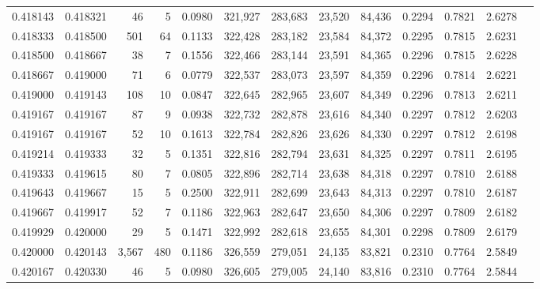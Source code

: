 \begin{tabular}{rrrrrrrrrrrrr}
0.418143 & 0.418321 &    46 &   5 &                                     0.0980 & 321,927 & 283,683 &  23,520 &  84,436 & 0.2294 & 0.7821 & 2.6278 \\
0.418333 & 0.418500 &   501 &  64 &                                     0.1133 & 322,428 & 283,182 &  23,584 &  84,372 & 0.2295 & 0.7815 & 2.6231 \\
0.418500 & 0.418667 &    38 &   7 &                                     0.1556 & 322,466 & 283,144 &  23,591 &  84,365 & 0.2296 & 0.7815 & 2.6228 \\
0.418667 & 0.419000 &    71 &   6 &                                     0.0779 & 322,537 & 283,073 &  23,597 &  84,359 & 0.2296 & 0.7814 & 2.6221 \\
0.419000 & 0.419143 &   108 &  10 &                                     0.0847 & 322,645 & 282,965 &  23,607 &  84,349 & 0.2296 & 0.7813 & 2.6211 \\
0.419167 & 0.419167 &    87 &   9 &                                     0.0938 & 322,732 & 282,878 &  23,616 &  84,340 & 0.2297 & 0.7812 & 2.6203 \\
0.419167 & 0.419167 &    52 &  10 &                                     0.1613 & 322,784 & 282,826 &  23,626 &  84,330 & 0.2297 & 0.7812 & 2.6198 \\
0.419214 & 0.419333 &    32 &   5 &                                     0.1351 & 322,816 & 282,794 &  23,631 &  84,325 & 0.2297 & 0.7811 & 2.6195 \\
0.419333 & 0.419615 &    80 &   7 &                                     0.0805 & 322,896 & 282,714 &  23,638 &  84,318 & 0.2297 & 0.7810 & 2.6188 \\
0.419643 & 0.419667 &    15 &   5 &                                     0.2500 & 322,911 & 282,699 &  23,643 &  84,313 & 0.2297 & 0.7810 & 2.6187 \\
0.419667 & 0.419917 &    52 &   7 &                                     0.1186 & 322,963 & 282,647 &  23,650 &  84,306 & 0.2297 & 0.7809 & 2.6182 \\
0.419929 & 0.420000 &    29 &   5 &                                     0.1471 & 322,992 & 282,618 &  23,655 &  84,301 & 0.2298 & 0.7809 & 2.6179 \\
0.420000 & 0.420143 & 3,567 & 480 &                                     0.1186 & 326,559 & 279,051 &  24,135 &  83,821 & 0.2310 & 0.7764 & 2.5849 \\
0.420167 & 0.420330 &    46 &   5 &                                     0.0980 & 326,605 & 279,005 &  24,140 &  83,816 & 0.2310 & 0.7764 & 2.5844 \\

\end{tabular}
